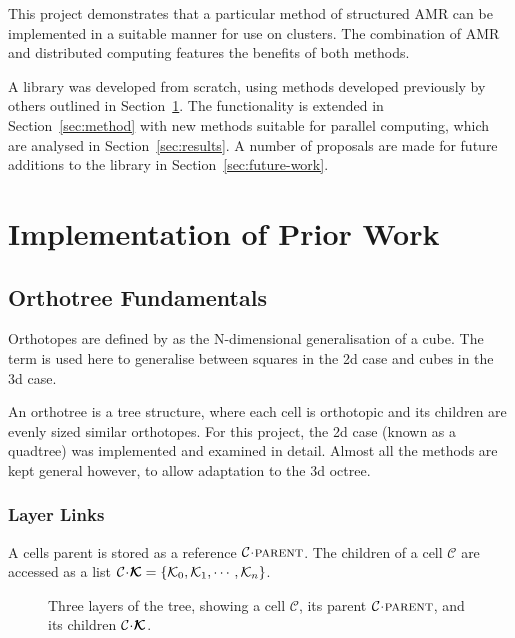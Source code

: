 \documentclass[twoside]{IIBproject}
\newcommand{\vect} [1] {\bm{#1}}
\newcommand{\acc}{{\mkern 0.5mu\cdot\mkern 0.5mu}}
\numberwithin{figure}{section}
\begin{document}
    This project demonstrates that a particular method of structured AMR can be implemented in a suitable manner for use on clusters. The combination of AMR and distributed computing features the benefits of both methods. 

    A library was developed from scratch, using methods developed previously by others outlined in Section~\ref{sec:existingmethods}. The functionality is extended in Section~\ref{sec:method} with new methods suitable for parallel computing, which are analysed in Section~\ref{sec:results}. A number of proposals are made for future additions to the library in Section~\ref{sec:future-work}. 


\section{Implementation of Prior Work}
    \label{sec:existingmethods}

    \subsection{Orthotree Fundamentals} %
        \label{sec:orthotree}

        Orthotopes are defined by \cite{coxeter73} as the N-dimensional generalisation of a cube. The term is used here to generalise between squares in the 2d case and cubes in the 3d case.

        An orthotree is a tree structure, where each cell is orthotopic and its children are evenly sized similar orthotopes. For this project, the 2d case (known as a quadtree) was implemented and examined in detail. Almost all the methods are kept general however, to allow adaptation to the 3d octree. 

        \subsubsection{Layer Links} %
            \label{sec:orthotree-layers}

            A cells parent is stored as a reference $\mathcal{C}\acc\textproc{parent}$. The children of a cell $\mathcal{C}$ are accessed as a list $\mathcal{C}\acc\vect{\mathcal{K}}=\{\mathcal{K}_0,\mathcal{K}_1,\cdots,\mathcal{K}_n\}$.

            \begin{figure}[H]
                \centering
                
                \caption{Three layers of the tree, showing a cell $\mathcal{C}$, its parent $\mathcal{C}\acc\textproc{parent}$, and its children $\mathcal{C}\acc\vect{\mathcal{K}}$.}
                \label{fig:ftt-layerlinks}
            \end{figure}
\end{document}
